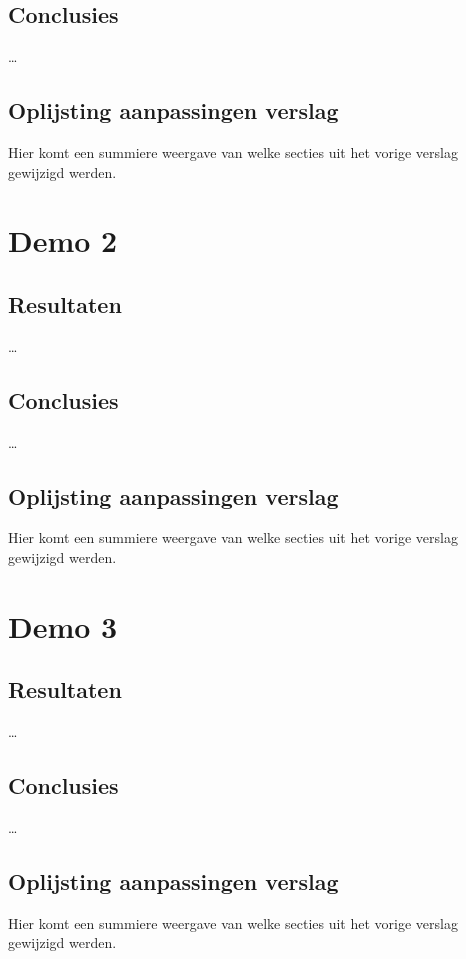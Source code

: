 \documentclass[eind]{penoverslag}
\begin{document}
\subsection{Conclusies}
\ldots

\subsection{Oplijsting aanpassingen verslag}
Hier komt een summiere weergave van welke secties uit het vorige verslag gewijzigd werden.


\section{Demo 2}

\subsection{Resultaten}
\ldots

\subsection{Conclusies}
\ldots

\subsection{Oplijsting aanpassingen verslag}
Hier komt een summiere weergave van welke secties uit het vorige verslag gewijzigd werden.


\section{Demo 3}

\subsection{Resultaten}
\ldots

\subsection{Conclusies}
\ldots

\subsection{Oplijsting aanpassingen verslag}
Hier komt een summiere weergave van welke secties uit het vorige verslag gewijzigd werden.
\end{document}
